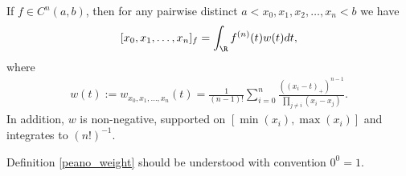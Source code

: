 \begin{lause}\label{peano_theorem}
	If $f \in C^{n}(a, b)$, then for any pairwise distinct $a < x_{0}, x_{1}, x_{2}, \ldots, x_{n} < b$ we have
	\begin{align}\label{peano_identity}
		[x_{0}, x_{1}, \ldots, x_{n}]_{f} = \int_{\R} f^{(n)}(t) w(t) dt,
	\end{align}
	where
	\begin{align}\label{peano_weight}
		w(t) := w_{x_{0}, x_{1}, \ldots, x_{n}}(t) = \frac{1}{(n - 1)!}\sum_{i = 0}^{n} \frac{((x_{i} - t)_{+})^{n - 1}}{\prod_{j \neq i} (x_{i} - x_{j})}.
	\end{align}
	In addition, $w$ is non-negative, supported on $[\min(x_{i}), \max(x_{i})]$ and integrates to $(n!)^{-1}$.
\end{lause}
Definition \ref{peano_weight} should be understood with convention $0^{0} = 1$.
